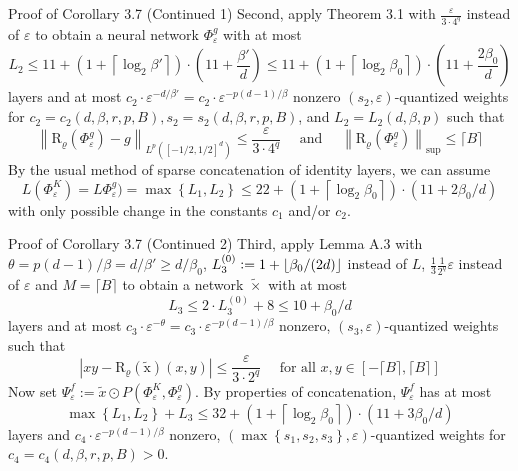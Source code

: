 \documentclass{if-beamer}
\newcommand{\defeq}{\vcentcolon=}
\begin{document}
\begin{frame}{Proof of Corollary 3.7 (Continued 1)}
    Second, apply Theorem 3.1 with $\frac{\varepsilon}{3\cdot 4^q}$ instead of $\varepsilon$ to obtain a neural network $\Phi_{\varepsilon}^{g}$ with at most $$L_2 \leq 11 + \left(1+\left\lceil\log _{2} \beta'\right\rceil\right) \cdot(11+\frac{\beta'}{d}) \leq 11 + \left(1+\left\lceil\log _{2} \beta_0\right\rceil\right) \cdot(11+\frac{2\beta_0}{d})$$ layers and at most $c_2\cdot \varepsilon^{-d/\beta'} = c_2\cdot \varepsilon^{-p(d-1)/\beta}$ nonzero $(s_2,\varepsilon)$-quantized weights for $c_2=c_2(d,\beta,r,p,B), s_2=s_2(d,\beta,r,p,B)$, and $L_2=L_2(d,\beta,p)$ such that
    {\small
    $$
    \left\|\mathrm{R}_{\varrho}\left(\Phi_{\varepsilon}^{g}\right)-g\right\|_{L^{p}\left([-1 / 2,1 / 2]^{d}\right)} \leq \frac{\varepsilon}{3 \cdot 4^{q}} \quad \text { and } \quad\left\|\mathrm{R}_{\varrho}\left(\Phi_{\varepsilon}^{g}\right)\right\|_{\mathrm{sup}} \leq\lceil B\rceil
    $$
    }%
    By the usual method of sparse concatenation of identity layers, we can assume $$L(\Phi_{\varepsilon}^{K})=L\Phi_{\varepsilon}^{g})=\max \left\{L_{1}, L_{2}\right\} \leq 22+\left(1+\left\lceil\log _{2} \beta_{0}\right\rceil\right) \cdot\left(11+2 \beta_{0} / d\right)$$
    with only possible change in the constants $c_1$ and/or $c_2$.
\end{frame}

\begin{frame}{Proof of Corollary 3.7 (Continued 2)}
    Third, apply Lemma A.3 with $\theta = p(d-1)/\beta = d/\beta' \geq d/\beta_0$, $L_3^{(0)} \defeq 1+\lfloor\beta_0/(2d) \rfloor$ instead of $L$, $\frac{1}{3}\frac{1}{2^q}\varepsilon$ instead of $\varepsilon$ and $M=\lceil B \rceil$ to obtain a network $\widetilde{\times}$ with at most 
    $$L_3 \leq 2 \cdot L_3^{(0)} + 8 \leq 10 + \beta_0/d $$
    layers and at most $c_3\cdot\varepsilon^{-\theta}=c_3\cdot\varepsilon^{-p(d-1)/\beta}$ nonzero, $(s_3,\varepsilon)$-quantized weights such that
    $$\left|x y-\mathrm{R}_{\varrho}(\widetilde{\mathrm{x}})(x, y)\right| \leq \frac{\varepsilon}{3 \cdot 2^{q}} \quad \text { for all } x, y \in[-\lceil B\rceil,\lceil B\rceil]
    $$
    Now set $\Psi_{\varepsilon}^{f}:=\widetilde{x} \odot P\left(\Phi_{\varepsilon}^{K}, \Phi_{\varepsilon}^{g}\right) .$ By properties of concatenation, $\Psi_{\varepsilon}^{f}$ has at most
    $$
    \max \left\{L_{1}, L_{2}\right\}+L_{3} \leq 32+\left(1+\left\lceil\log _{2} \beta_{0}\right\rceil\right) \cdot\left(11+3 \beta_{0} / d\right)
    $$
    layers and $c_{4} \cdot \varepsilon^{-p(d-1) / \beta}$ nonzero, $\left(\max \left\{s_{1}, s_{2}, s_{3}\right\}, \varepsilon\right)$-quantized weights for $c_{4}=c_{4}(d, \beta, r, p, B)>0$.
\end{frame}
\end{document}

